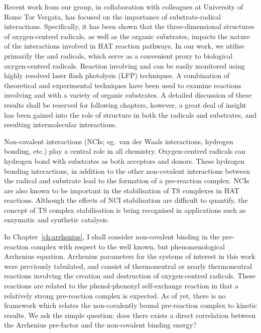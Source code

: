 Recent work from our group, in collaboration with colleagues at University of Rome Tor Vergata, has focused on the importance of substrate-radical interactions. Specifically, it has been shown that the three-dimensional structures of oxygen-centred radicals, as well as the organic substrates, impacts the nature of the interactions involved in HAT reaction pathways.\cite{Salamone2015Rev} In our work, we utilise primarily the \bno and \cumo radicals, which serve as a convenient proxy to biological oxygen-centred radicals. Reaction involving \bno and \cumo can be easily monitored using highly resolved laser flash photolysis (LFP) techniques. A combination of theoretical and experimental techniques have been used to examine reactions involving \bno and \cumo with a variety of organic substrates. A detailed discussion of these results shall be reserved for following chapters, however, a great deal of insight has been gained into the role of structure in both the radicals and substrates, and resulting intermolecular interactions.

Non-covalent interactions (NCIs; eg.\ van der Waals interactions, hydrogen bonding, etc.)  play a central role in all chemistry. Oxygen-centred radicals can hydrogen bond with substrates as both acceptors and donors.\cite{Johnson2009a} These hydrogen bonding interactions, in addition to the other non-covalent interactions between the radical and substrate lead to the formation of a pre-reaction complex. NCIs are also known to be important in the stabilisation of TS complexes in HAT reactions.\cite{DiLabio2005,DiLabio2007} Although the effects of NCI stabilisation are difficult to quantify, the concept of TS complex stabilisation is being recognised in applications such as enzymatic\cite{Uyeda2011} and synthetic catalysis.\cite{Bakr2016}

In Chapter~\ref{ch:arrhenius}, I shall consider non-covalent binding in the pre-reaction complex with respect to the well known, but phenomenological Arrhenius equation. Arrhenius parameters for the systems of interest in this work were previously tabulated,\cite{DiLabio2005} and consist of thermoneutral or nearly thermoneutral reactions involving the creation and destruction of oxygen-centred radicals. These reactions are related to the phenol-phenoxyl self-exchange reaction in that a relatively strong pre-reaction complex is expected. As of yet, there is no framework which relates the non-covalently bound pre-reaction complex to kinetic results. We ask the simple question: does there exists a direct correlation between the Arrhenius pre-factor and the non-covalent binding energy?

